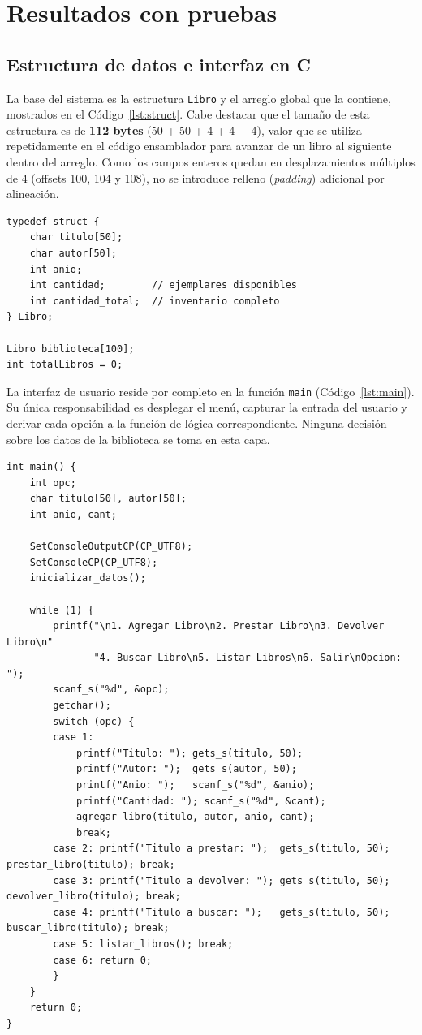 \documentclass[a4paper,12pt]{article}
\begin{document}
\section{Resultados con pruebas}
\subsection{Estructura de datos e interfaz en C}
La base del sistema es la estructura \texttt{Libro} y el arreglo global que la contiene, mostrados en el Código~\ref{lst:struct}. Cabe destacar que el tamaño de esta estructura es de \textbf{112 bytes} (50 + 50 + 4 + 4 + 4), valor que se utiliza repetidamente en el código ensamblador para avanzar de un libro al siguiente dentro del arreglo. Como los campos enteros quedan en desplazamientos múltiplos de 4 (offsets 100, 104 y 108), no se introduce relleno (\textit{padding}) adicional por alineación.

\begin{lstlisting}[style=cStyle, caption={Definición de la estructura \texttt{Libro} y variables globales.}, label={lst:struct}]
typedef struct {
    char titulo[50];
    char autor[50];
    int anio;
    int cantidad;        // ejemplares disponibles
    int cantidad_total;  // inventario completo
} Libro;

Libro biblioteca[100];
int totalLibros = 0;
\end{lstlisting}

La interfaz de usuario reside por completo en la función \texttt{main} (Código~\ref{lst:main}). Su única responsabilidad es desplegar el menú, capturar la entrada del usuario y derivar cada opción a la función de lógica correspondiente. Ninguna decisión sobre los datos de la biblioteca se toma en esta capa.

\begin{lstlisting}[style=cStyle, caption={Menú principal y captura de datos (interfaz en C).}, label={lst:main}]
int main() {
    int opc;
    char titulo[50], autor[50];
    int anio, cant;

    SetConsoleOutputCP(CP_UTF8);
    SetConsoleCP(CP_UTF8);
    inicializar_datos();

    while (1) {
        printf("\n1. Agregar Libro\n2. Prestar Libro\n3. Devolver Libro\n"
               "4. Buscar Libro\n5. Listar Libros\n6. Salir\nOpcion: ");
        scanf_s("%d", &opc);
        getchar();
        switch (opc) {
        case 1:
            printf("Titulo: "); gets_s(titulo, 50);
            printf("Autor: ");  gets_s(autor, 50);
            printf("Anio: ");   scanf_s("%d", &anio);
            printf("Cantidad: "); scanf_s("%d", &cant);
            agregar_libro(titulo, autor, anio, cant);
            break;
        case 2: printf("Titulo a prestar: ");  gets_s(titulo, 50); prestar_libro(titulo); break;
        case 3: printf("Titulo a devolver: "); gets_s(titulo, 50); devolver_libro(titulo); break;
        case 4: printf("Titulo a buscar: ");   gets_s(titulo, 50); buscar_libro(titulo); break;
        case 5: listar_libros(); break;
        case 6: return 0;
        }
    }
    return 0;
}
\end{lstlisting}
\end{document}
